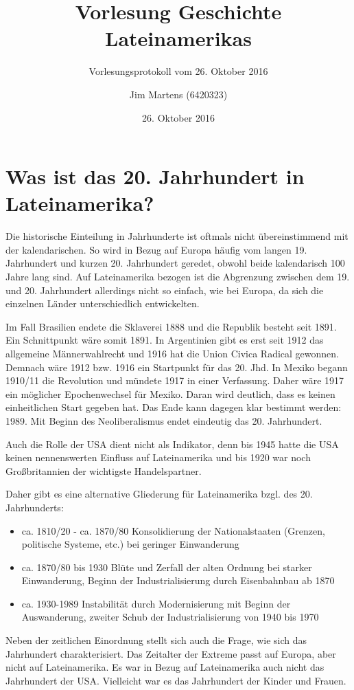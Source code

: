 \documentclass[10pt,a4paper,oneside,ngerman,numbers=noenddot]{scrartcl}
\newenvironment{myitemize}{\begin{itemize}\itemsep -9pt}{\end{itemize}} %
\begin{document}
\author{Jim Martens (6420323)}
\title{Vorlesung Geschichte Lateinamerikas}
\subtitle{Vorlesungsprotokoll vom 26. Oktober 2016}
\date{26. Oktober 2016}
\maketitle


\section*{Was ist das 20. Jahrhundert in Lateinamerika?}

Die historische Einteilung in Jahrhunderte ist oftmals nicht übereinstimmend
mit der kalendarischen. So wird in Bezug auf Europa häufig vom langen 19. Jahrhundert
und kurzen 20. Jahrhundert geredet, obwohl beide kalendarisch 100 Jahre lang sind.
Auf Lateinamerika bezogen ist die Abgrenzung zwischen dem 19. und 20. Jahrhundert
allerdings nicht so einfach, wie bei Europa, da sich die einzelnen Länder unterschiedlich
entwickelten.

Im Fall Brasilien endete die Sklaverei 1888 und die Republik besteht seit 1891.
Ein Schnittpunkt wäre somit 1891. In Argentinien gibt es erst seit 1912 das
allgemeine Männerwahlrecht und 1916 hat die Union Civica Radical gewonnen.
Demnach wäre 1912 bzw. 1916 ein Startpunkt für das 20. Jhd. In Mexiko begann
1910/11 die Revolution und mündete 1917 in einer Verfassung. Daher wäre 1917
ein möglicher Epochenwechsel für Mexiko. Daran wird deutlich, dass es keinen
einheitlichen Start gegeben hat. Das Ende kann dagegen klar bestimmt werden:
1989. Mit Beginn des Neoliberalismus endet eindeutig das 20. Jahrhundert.

Auch die Rolle der USA dient nicht als Indikator, denn bis 1945 hatte die USA
keinen nennenswerten Einfluss auf Lateinamerika und bis 1920 war noch Großbritannien
der wichtigste Handelspartner.

Daher gibt es eine alternative Gliederung für Lateinamerika bzgl. des 20. Jahrhunderts:

\begin{myitemize}
    \item ca. 1810/20 - ca. 1870/80 Konsolidierung der Nationalstaaten (Grenzen, politische
          Systeme, etc.) bei geringer Einwanderung
    \item ca. 1870/80 bis 1930 Blüte und Zerfall der alten Ordnung bei starker Einwanderung,
          Beginn der Industrialisierung durch Eisenbahnbau ab 1870
    \item ca. 1930-1989 Instabilität durch Modernisierung mit Beginn der Auswanderung,
          zweiter Schub der Industrialisierung von 1940 bis 1970
\end{myitemize}

Neben der zeitlichen Einordnung stellt sich auch die Frage, wie sich das Jahrhundert
charakterisiert. Das Zeitalter der Extreme passt auf Europa, aber nicht auf
Lateinamerika. Es war in Bezug auf Lateinamerika auch nicht das Jahrhundert der
USA. Vielleicht war es das Jahrhundert der Kinder und Frauen.
\end{document}
